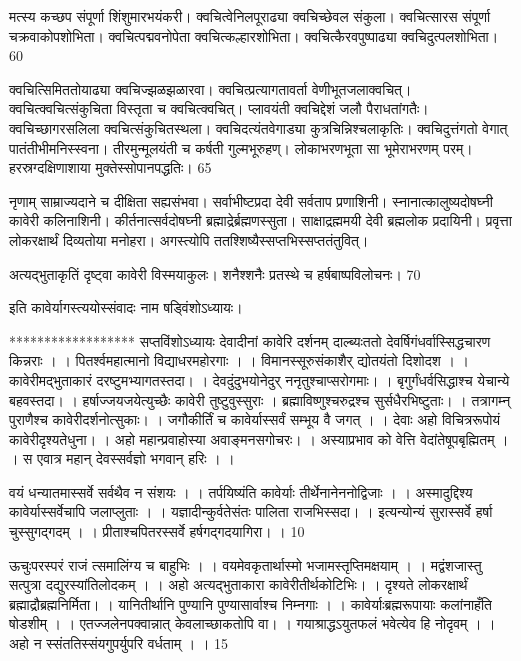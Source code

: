 मत्स्य कच्छप संपूर्णा शिंशुमारभयंकरी।
 क्वचित्वेनिलपूराढ्या क्वचिच्छेवल संकुला।
 क्वचित्सारस संपूर्णा चक्रवाकोपशोभिता।
 क्वचित्पद्मवनोपेता क्वचित्कल्हारशोभिता।
 क्वचित्कैरवपुष्पाढ्या क्वचिदुत्पलशोभिता।
 60

  क्वचित्सिमिततोयाढ्या क्वचिज्झळझळारवा।
 क्वचित्प्रत्यागतावर्ता वेणीभूतजलाक्वचित्।
 क्वचित्क्वचित्संकुचिता विस्तृता च क्वचित्क्वचित्।
 प्लावयंती क्वचिद्देशं जलौ पैराधतांगतैः।
 क्वचिच्छागरसलिला क्वचित्संकुचितस्थला।
 क्वचिदत्यंतवेगाड्या कुत्रचिन्निश्चलाकृतिः।
 क्वचिदुत्तंगतो वेगात् पातंतीभीमनिस्स्वना।
 तीरमुन्मूलयंती च कर्षती गुल्मभूरुहण्।
 लोकाभरणभूता सा भूमेराभरणम् परम्।
 हरस्रग्दक्षिणाशाया मुक्तेस्सोपानपद्धतिः।
 65

  नृणाम् साम्राज्यदाने च दीक्षिता सह्यसंभवा।
 सर्वाभीष्टप्रदा देवी सर्वताप प्रणाशिनी।
 स्नानात्कालुष्यदोषघ्नी कावेरी कलिनाशिनी।
 कीर्तनात्सर्वदोषघ्नी ब्रह्माद्रेर्ब्रह्मणस्सुता।
 साक्षाद्रह्ममयी देवी ब्रह्मलोक प्रदायिनी।
 प्रवृत्ता लोकरक्षार्थं दिव्यतोया मनोहरा।
 अगस्त्योपि ततश्शिष्यैस्सप्तभिस्सप्ततंतुवित्।
 
अत्यद्भुताकृतिं दृष्ट्वा कावेरी विस्मयाकुलः।
 शनैश्शनैः प्रतस्थे च हर्षबाष्पविलोचनः।
 70

  इति कावेर्यागस्त्ययोस्संवादः नाम षड्विंशोऽध्यायः।

******************
सप्तविंशोऽध्यायः
देवादीनां कावेरि दर्शनम् दाल्ब्यःततो देवर्षिगंधर्वास्सिद्धचारण किन्नराः ।
।
 पितर्श्वमहात्मानो विद्याधरमहोरगाः ।
 ।
 विमानस्सूरुसंकाशैर् द्योतयंतो दिशोदश ।
 ।
 कावेरीमद्भुताकारं दरष्टुमभ्यागतस्तदा।
 ।
 देवदुंदुभयोनेदुर् ननृतुश्चाप्सरोगमाः।
 ।
 बृगुर्गंधर्वसिद्धाश्च येचान्ये बहवस्तदा।
 ।
 हर्षाज्जयजयेत्युच्छैः कावेरी तुष्टुवुस्सुराः ।
 ब्रह्माविष्णुश्चरुद्रश्च सुर्सधैरभिष्टुताः।
 ।
 तत्रागम्न् पुराणैश्च कावेरीदर्शनोत्सुकाः।
 ।
 जगौकीर्तिं च कावेर्यास्सर्वं सम्भूय वै जगत् ।
 ।
 देवाः अहो विचित्ररूपोयं कावेरीदृश्यतेधुना।
 ।
 अहो महान्प्रवाहोस्या अवाङ्मनसगोचरः।
 ।
 अस्याप्रभाव को वेत्ति वेदांतेषूपबृह्मितम् ।
 ।
 स एवात्र महान् देवस्सर्वज्ञो भगवान् हरिः ।
 ।

वयं धन्यातमास्सर्वे सर्वथैव न संशयः ।
।
 तर्पयिष्यंति कावेर्याः तीर्थेनानेननोद्विजाः ।
 ।
 अस्मादुद्दिश्य कावेर्यास्सर्वेचापि जलाप्लुताः ।
 ।
 यज्ञादीन्कुर्वतेसंतः पालिता राजभिस्सदा।
 ।
 इत्यन्योन्यं सुरास्सर्वे हर्षा चुस्सुगद्गदम् ।
 ।
 प्रीताश्चपितरस्सर्वे हर्षगद्गदयागिरा।
 ।
 10

  ऊचुःपरस्परं राजं त्समालिंग्य च बाहुभिः ।
 ।
 वयमेवकृतार्थास्मो भजामस्तृप्तिमक्षयाम् ।
 ।
 मद्वंशजास्तु सत्पुत्रा दद्युरस्यांतिलोदकम् ।
 ।
 अहो अत्यद्भुताकारा कावेरीतीर्थकोटिभिः।
 ।
 दृश्यते लोकरक्षार्थं ब्रह्माद्रौब्रह्मनिर्मिता।
 ।
 यानितीर्थानि पुण्यानि पुण्यासार्वाश्च निम्नगाः ।
 ।
 कावेर्याःब्रह्मरूपायाः कलांनाहँति षोडशीम् ।
 ।
 एतज्जलेनपक्वान्नात् केवलाच्छाकतोपि वा।
 ।
 गयाश्राद्धऽयुतफलं भवेत्येव हि नोदृवम् ।
 ।
 अहो न स्संततिस्संयगुपर्युपरि वर्धताम् ।
 ।
15

